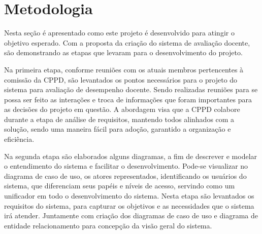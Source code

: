 \newpage

\newpage
\chapter{Metodologia}

    Nesta seção é apresentado como este projeto é desenvolvido para atingir o objetivo esperado. Com a proposta da criação do sistema de avaliação docente, são demonstrando as etapas que levaram para o desenvolvimento do projeto.

    Na primeira etapa, conforme reuniões com os atuais membros pertencentes à comissão da CPPD, são levantados os pontos necessários para o projeto do sistema para avaliação de desempenho docente. Sendo realizadas reuniões para se possa ser feito as interações e troca de informações que foram importantes para as decisões do projeto em questão. A abordagem visa que a CPPD colabore durante a etapa de análise de requisitos, mantendo todos alinhados com a solução, sendo uma maneira fácil para adoção, garantido a organização e eficiência.
    

     Na segunda etapa são elaborados alguns diagramas, a fim de descrever e modelar o entendimento do sistema e facilitar o desenvolvimento. Pode-se visualizar no diagrama de caso de uso, os atores representados, identificando os usuários do sistema, que diferenciam seus papéis e níveis de acesso, servindo como um unificador em todo o desenvolvimento do sistema. Nesta etapa são levantados os requisitos do sistema, para capturar os objetivos e as necessidades que o sistema irá atender. Juntamente com criação dos diagramas de caso de uso e diagrama de entidade relacionamento para concepção da visão geral do sistema.

